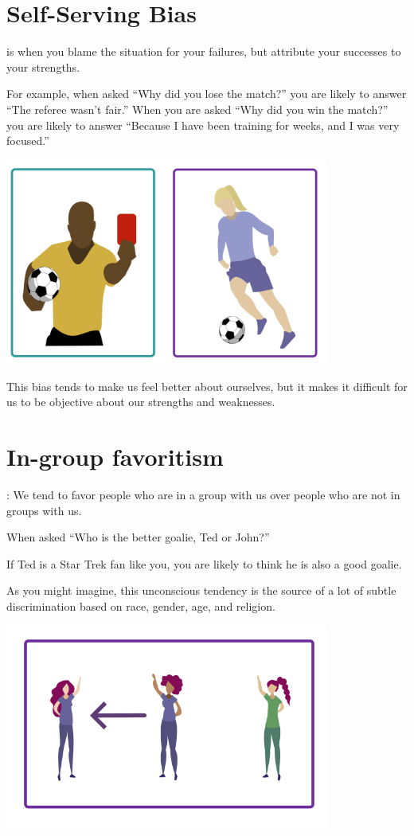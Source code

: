 \section{Self-Serving Bias}

 is when you blame the situation for your
failures, but attribute your successes to your strengths.

For example, when asked ``Why did you lose the match?'' you are likely
to answer ``The referee wasn't fair.''  When you are asked ``Why did
you win the match?'' you are likely to answer ``Because I have been
training for weeks, and I was very focused.''

\includegraphics[width=0.8\textwidth]{bias_soccer.png}

This bias tends to make us feel better about ourselves, but it makes it
difficult for us to be objective about our strengths and weaknesses.

\section{In-group favoritism}

: We tend to favor people who are in
a group with us over people who are not in groups with us.

When asked ``Who is the better goalie, Ted or John?''

If Ted is a Star Trek fan like you, you are likely to think he is also
a good goalie.

As you might imagine, this unconscious tendency is the source of a lot
of subtle discrimination based on race, gender, age, and religion.

\includegraphics[width=0.8\textwidth]{bias_group.png}

